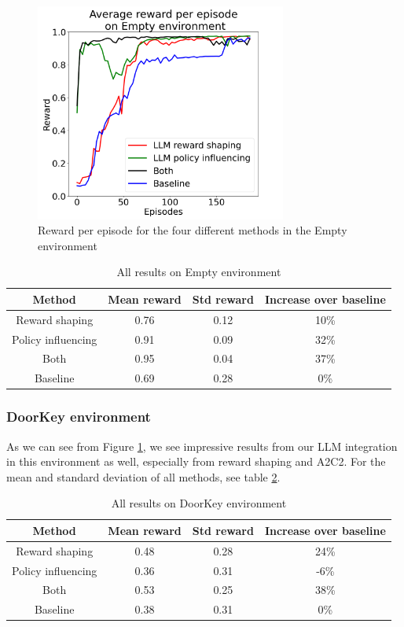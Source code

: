 \documentclass[conference]{IEEEtran}
\begin{document}
\begin{figure}[h]
\centerline{\includegraphics[width=3.25in]{figure/emptyresults.png}}
\caption{Reward per episode for the four different methods in the Empty environment}
\label{doorkeyresults}
\end{figure}

\begin{table}[h]
\caption{All results on Empty environment}
\begin{center}
\label{emptytable}
\begin{tabular}{c | c c c}
Method & Mean reward & Std reward & Increase over baseline \\
\hline
Reward shaping & 0.76 & 0.12 & 10\% \\
Policy influencing & 0.91 & 0.09 & 32\% \\
Both & 0.95 & 0.04 & 37\% \\
Baseline & 0.69 & 0.28 & 0\% \\
\end{tabular}
\end{center}
\end{table}


\subsubsection{DoorKey environment}

As we can see from Figure \ref{doorkeyresults}, we see impressive results from our LLM integration in this environment as well, especially from reward shaping and A2C2. For the mean and standard deviation of all methods, see table \ref{doorkeytable}.

\begin{table}[h]
\caption{All results on DoorKey environment}
\begin{center}
\label{doorkeytable}
\begin{tabular}{c | c c c}
Method & Mean reward & Std reward & Increase over baseline \\
\hline
Reward shaping & 0.48 & 0.28 & 24\% \\
Policy influencing & 0.36 & 0.31 & -6\% \\
Both & 0.53 & 0.25 & 38\% \\
Baseline & 0.38 & 0.31 & 0\% \\
\end{tabular}
\end{center}
\end{table}
\end{document}

